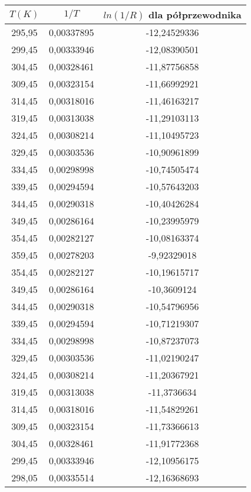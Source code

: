 \documentclass[10pt,a4paper]{article}
\begin{document}
\begin{center}
\begin{tabular}{|c|c|c|}
\multicolumn{1}{c}{$T (K)$} & \multicolumn{1}{c}{$1/T$} & \multicolumn{1}{c}{$ln(1/R)$ dla półprzewodnika}\\
\hline
295,95&0,00337895&-12,24529336\\ 
 \hline 
299,45&0,00333946&-12,08390501\\ 
 \hline 
304,45&0,00328461&-11,87756858\\ 
 \hline 
309,45&0,00323154&-11,66992921\\ 
 \hline 
314,45&0,00318016&-11,46163217\\ 
 \hline 
319,45&0,00313038&-11,29103113\\ 
 \hline 
324,45&0,00308214&-11,10495723\\ 
 \hline 
329,45&0,00303536&-10,90961899\\ 
 \hline 
334,45&0,00298998&-10,74505474\\ 
 \hline 
339,45&0,00294594&-10,57643203\\ 
 \hline 
344,45&0,00290318&-10,40426284\\ 
 \hline 
349,45&0,00286164&-10,23995979\\ 
 \hline 
354,45&0,00282127&-10,08163374\\ 
 \hline 
359,45&0,00278203&-9,92329018\\ 
 \hline 
354,45&0,00282127&-10,19615717\\ 
 \hline 
349,45&0,00286164&-10,3609124\\ 
 \hline 
344,45&0,00290318&-10,54796956\\ 
 \hline 
339,45&0,00294594&-10,71219307\\ 
 \hline 
334,45&0,00298998&-10,87237073\\ 
 \hline 
329,45&0,00303536&-11,02190247\\ 
 \hline 
324,45&0,00308214&-11,20367921\\ 
 \hline 
319,45&0,00313038&-11,3736634\\ 
 \hline 
314,45&0,00318016&-11,54829261\\ 
 \hline 
309,45&0,00323154&-11,73366613\\ 
 \hline 
304,45&0,00328461&-11,91772368\\ 
 \hline 
299,45&0,00333946&-12,10956175\\ 
 \hline 
298,05&0,00335514&-12,16368693\\ 
 \hline 

\end{tabular}
\end{center}
\end{document}
